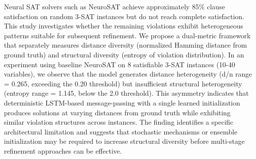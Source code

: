 
Neural SAT solvers such as NeuroSAT achieve approximately 85\% clause satisfaction on random 3-SAT instances but do not reach complete satisfaction. This study investigates whether the remaining violations exhibit heterogeneous patterns suitable for subsequent refinement. We propose a dual-metric framework that separately measures distance diversity (normalized Hamming distance from ground truth) and structural diversity (entropy of violation distribution). In an experiment using baseline NeuroSAT on 8 satisfiable 3-SAT instances (10-40 variables), we observe that the model generates distance heterogeneity (d/n range = 0.265, exceeding the 0.20 threshold) but insufficient structural heterogeneity (entropy range = 1.145, below the 2.0 threshold). This asymmetry indicates that deterministic LSTM-based message-passing with a single learned initialization produces solutions at varying distances from ground truth while exhibiting similar violation structures across instances. The finding identifies a specific architectural limitation and suggests that stochastic mechanisms or ensemble initialization may be required to increase structural diversity before multi-stage refinement approaches can be effective.
